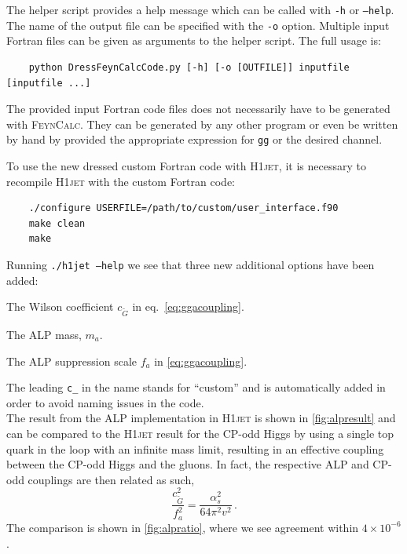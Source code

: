 \documentclass[12pt]{article}
\begin{document}
The helper script provides a help message which can be called with
\texttt{-h} or \texttt{--help}. The name of the output file can be
specified with the \texttt{-o} option. Multiple input Fortran files
can be given as arguments to the helper script. The full usage is:
\begin{lstlisting}
	python DressFeynCalcCode.py [-h] [-o [OUTFILE]] inputfile [inputfile ...] 
\end{lstlisting}
The provided input Fortran code files does not necessarily have to be
generated with \textsc{FeynCalc}. They can be generated by any other
program or even be written by hand by provided the appropriate
expression for \texttt{gg} or the desired channel.

To use the new dressed custom Fortran code with \textsc{H1jet}, it is necessary to recompile \textsc{H1jet} with the custom Fortran code: 
\begin{lstlisting}
	./configure USERFILE=/path/to/custom/user_interface.f90 
	make clean
	make 
\end{lstlisting}
Running \texttt{./h1jet --help} we see that three new additional options have been added: 
\begin{description}[labelindent=1cm, labelwidth =\widthof{\bfseries9999999999999999999999}, leftmargin = !] 
	\item[\texttt{--c\_CGtil <value>}] The Wilson coefficient $c_{\tilde{G}}$ in eq.~\eqref{eq:ggacoupling}. 
	\item[\texttt{--c\_mA <value>}] The ALP mass, $m_a$. 
	\item[\texttt{--c\_fa <value>}] The ALP suppression scale $f_a$ in \eqref{eq:ggacoupling}. 
\end{description}
The leading \texttt{c\_} in the name stands for ``custom'' and is automatically added in order to avoid naming issues in the code. \\ 

The result from the ALP implementation in \textsc{H1jet} is shown in \autoref{fig:alpresult} and can be compared to the \textsc{H1jet} result for the CP-odd Higgs by using a single top quark in the loop with an infinite mass limit, resulting in an effective coupling between the CP-odd Higgs and the gluons. In fact, the respective ALP and CP-odd couplings are then related as such, 
\begin{equation}
	\frac{c_{\tilde{G}}^2}{f_a^2} = \frac{\alpha_s^2}{64 \pi^2 v^2} \,. 
\end{equation}
The comparison is shown in \autoref{fig:alpratio}, where we see agreement within $4\times 10^{-6}$. 
\end{document}
